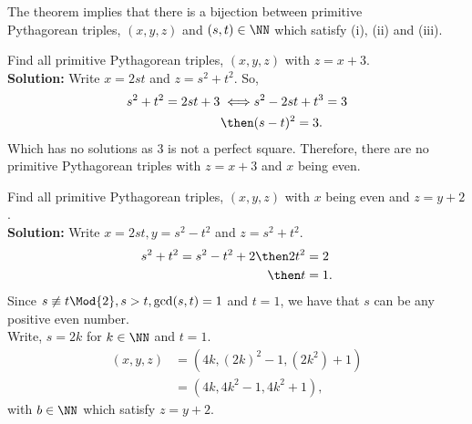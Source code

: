 \documentclass[12pt, a4paper]{article}
\begin{document}
\begin{mdremark}
    The theorem implies that there is a bijection between primitive \\ Pythagorean triples, \((x,y,z)\) and \((s,t) \in \NN\) which satisfy (i), (ii) and (iii).
\end{mdremark}

\begin{example}
    Find all primitive Pythagorean triples, \((x,y,z)\) with \(z=x+3\). \\
    \textbf{Solution:} Write \(x=2st\) and \(z=s^2+t^2\). So,
    \[\begin{aligned}
        s^2+t^2 =2st+3 \iff &s^2-2st+t^3 = 3 \\
                        \then &(s-t)^2 =3. 
    \end{aligned}\]
    Which has no solutions as \(3\) is not a perfect square. Therefore, there are no primitive Pythagorean triples with \(z=x+3\) and \(x\) being even.
\end{example}

\begin{example}
    Find all primitive Pythagorean triples, \((x,y,z)\) with \(x\) being even and \(z=y+2\). \\
    \textbf{Solution:} Write \(x=2st, y=s^2-t^2\) and \(z=s^2+t^2\).
    \[\begin{aligned}
        s^2+t^2=s^2-t^2+2 \then 2t^2&=2 \\
                        \then t&=1.
    \end{aligned}\]
    Since \(s\not\equiv t \Mod{2}, s>t,\gcd(s,t)=1\) and \(t=1\), we have that \(s\) can be any positive even number. \\
    Write, \(s =2k\) for \(k\in \NN\) and \(t=1\).
    \[\begin{aligned}
        (x,y,z) &= (4k, (2k)^2-1, (2k^2)+1) \\
                &= (4k, 4k^2-1,4k^2+1),
    \end{aligned}\]
    with \(b\in \NN\) which satisfy \(z=y+2\).
\end{example}
\end{document}
